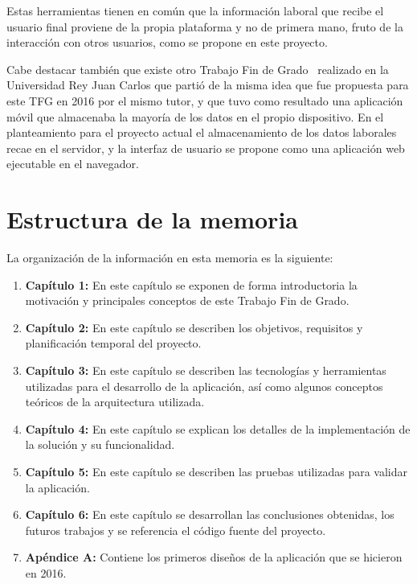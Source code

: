 \documentclass[a4paper, 12pt]{book}
\begin{document}
    Estas herramientas tienen en común que la información laboral que recibe el usuario final proviene de la propia plataforma
    y no de primera mano, fruto de la interacción con otros usuarios, como se propone en este proyecto.

    Cabe destacar también que existe otro Trabajo Fin de Grado~\cite{bib:tfg} realizado en la Universidad Rey Juan Carlos que partió
    de la misma idea que fue propuesta para este TFG en 2016 por el mismo tutor, y que tuvo como resultado una aplicación móvil que
    almacenaba la mayoría de los datos en el propio dispositivo. En el planteamiento para el proyecto actual el almacenamiento de los
    datos laborales recae en el servidor, y la interfaz de usuario se propone como una aplicación web ejecutable en el navegador.


    \section{Estructura de la memoria}
    \label{sec:intro_memorystructure}
    La organización de la información en esta memoria es la siguiente:

    \begin{enumerate}
        \item \textbf{Capítulo 1:} En este capítulo se exponen de forma introductoria la motivación y principales conceptos de este Trabajo Fin de Grado.
        \item \textbf{Capítulo 2:} En este capítulo se describen los objetivos, requisitos y planificación temporal del proyecto.
        \item \textbf{Capítulo 3:} En este capítulo se describen las tecnologías y herramientas utilizadas para el desarrollo de la aplicación,
        así como algunos conceptos teóricos de la arquitectura utilizada.
        \item \textbf{Capítulo 4:} En este capítulo se explican los detalles de la implementación de la solución y su funcionalidad.
        \item \textbf{Capítulo 5:} En este capítulo se describen las pruebas utilizadas para validar la aplicación.
        \item \textbf{Capítulo 6:} En este capítulo se desarrollan las conclusiones obtenidas, los futuros trabajos y se referencia
        el código fuente del proyecto.
        \item \textbf{Apéndice A:} Contiene los primeros diseños de la aplicación que se hicieron en 2016.
    \end{enumerate}
\end{document}
